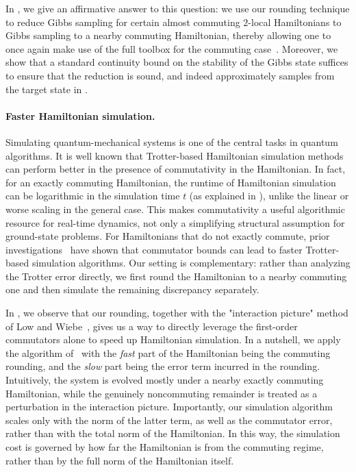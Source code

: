 \documentclass[11pt]{article}
\theoremstyle{plain}
\begin{document}
In , we give an affirmative answer to this question: we 
use our rounding technique to reduce Gibbs sampling for certain almost 
commuting $2$-local Hamiltonians to Gibbs sampling to a nearby 
commuting Hamiltonian, thereby allowing one to once again make use of 
the full toolbox for the commuting case~\cite{hwang2025gibbsstatepreparationcommuting,schmidhuber2025hamiltoniandecodedquantuminterferometry}.
Moreover, we show that a standard continuity bound on the stability of the Gibbs state suffices to ensure 
that the reduction is sound, and indeed approximately samples from the 
target state in .

\paragraph{Faster Hamiltonian simulation.}
Simulating quantum-mechanical systems is one of the central tasks in quantum algorithms.
It is well known that Trotter-based Hamiltonian simulation methods can perform better in the presence of commutativity in the Hamiltonian. In fact, for an exactly commuting Hamiltonian, the runtime of Hamiltonian simulation can be logarithmic in the simulation time $t$ (as explained in ), unlike the linear or worse scaling in the general case.
This makes commutativity a useful algorithmic resource for real-time dynamics, not only a simplifying structural assumption for ground-state problems.
For Hamiltonians that do not exactly commute, prior investigations~\cite{childs2021theory} have shown that commutator bounds can lead to faster Trotter-based simulation algorithms.  Our setting is complementary: rather than analyzing the Trotter error directly, we first round the Hamiltonian to a nearby commuting one and then simulate the remaining discrepancy separately.

In , we observe that our rounding, together with the "interaction picture" method of Low and Wiebe~\cite{low2018hamiltonian}, gives us a way to directly leverage the first-order commutators alone to speed up Hamiltonian simulation. In a nutshell, we apply the algorithm of~\cite{low2018hamiltonian} with the \emph{fast} part of the Hamiltonian being the commuting rounding, and the \emph{slow} part being the error term incurred in the rounding. 
Intuitively, the system is evolved mostly under a nearby exactly commuting Hamiltonian, while the genuinely noncommuting remainder is treated as a perturbation in the interaction picture.
Importantly, our simulation algorithm scales only with the norm of the latter term, as well as the commutator error,
rather than with the total norm of the Hamiltonian.
In this way, the simulation cost is governed by how far the Hamiltonian is from the commuting regime, rather than by the full norm of the Hamiltonian itself.
\end{document}

